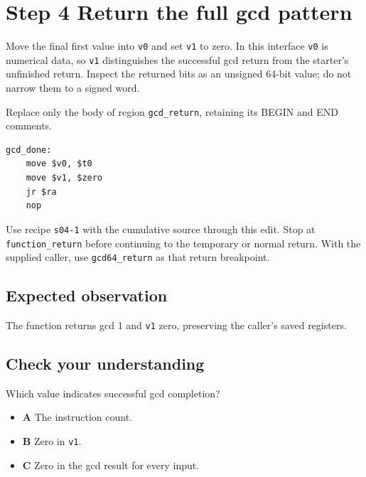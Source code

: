 \section{Step 4 Return the full gcd pattern}\label{rsa-s04}

Move the final first value into \texttt{v0} and set \texttt{v1} to zero. In this interface \texttt{v0} is numerical data, so \texttt{v1} distinguishes the successful gcd return from the starter's unfinished return. Inspect the returned bits as an unsigned 64-bit value; do not narrow them to a signed word.

Replace only the body of region \texttt{gcd\_return}, retaining its BEGIN and END comments.

\begin{verbatim}
gcd_done:
    move $v0, $t0
    move $v1, $zero
    jr $ra
    nop
\end{verbatim}

Use recipe \texttt{s04-1} with the cumulative source through this edit. Stop at \texttt{function\_return} before continuing to the temporary or normal return. With the supplied caller, use \texttt{gcd64\_return} as that return breakpoint.

\subsection{Expected observation}
The function returns gcd 1 and \texttt{v1} zero, preserving the caller's saved registers.

\subsection{Check your understanding}
Which value indicates successful gcd completion?

\begin{itemize}
  \item \textbf{A} The instruction count.
  \item \textbf{B} Zero in \texttt{v1}.
  \item \textbf{C} Zero in the gcd result for every input.
\end{itemize}
